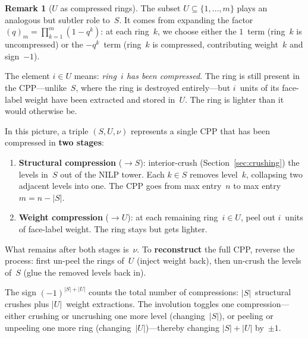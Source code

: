 \documentclass[11pt]{article}
\theoremstyle{plain}
\theoremstyle{definition}
\newtheorem{remark}[theorem]{Remark}
\begin{document}
\begin{remark}[$U$ as compressed rings]
\label{rmk:U-compressed}
The subset $U \subseteq \{1, \ldots, m\}$ plays an analogous but
subtler role to~$S$.  It comes from expanding the factor
$(q)_m = \prod_{k=1}^{m}(1-q^k)$: at each ring~$k$, we choose
either the $1$~term (ring~$k$ is uncompressed) or the $-q^k$~term
(ring~$k$ is compressed, contributing weight~$k$ and sign~$-1$).

The element $i \in U$ means: \emph{ring~$i$ has been compressed}.
The ring is still present in the CPP---unlike~$S$, where the ring
is destroyed entirely---but $i$~units of its face-label weight
have been extracted and stored in~$U$.  The ring is lighter than
it would otherwise be.

In this picture, a triple $(S, U, \nu)$ represents a single CPP
that has been compressed in \textbf{two stages}:
\begin{enumerate}
  \item \textbf{Structural compression} ($\to S$):\;
    interior-crush (Section~\ref{sec:crushing}) the levels in~$S$
    out of the NILP tower.  Each $k \in S$ removes level~$k$,
    collapsing two adjacent levels into one.  The CPP goes from
    max entry~$n$ to max entry~$m = n - |S|$.
  \item \textbf{Weight compression} ($\to U$):\;
    at each remaining ring~$i \in U$, peel out $i$~units of
    face-label weight.  The ring stays but gets lighter.
\end{enumerate}
What remains after both stages is~$\nu$.  To \textbf{reconstruct}
the full CPP, reverse the process: first un-peel the rings of~$U$
(inject weight back), then un-crush the levels of~$S$ (glue the
removed levels back in).

The sign $(-1)^{|S|+|U|}$ counts the total number of
compressions: $|S|$~structural crushes plus $|U|$~weight
extractions.  The involution toggles one compression---either
crushing or uncrushing one more level (changing~$|S|$), or
peeling or unpeeling one more ring (changing~$|U|$)---thereby
changing $|S|+|U|$ by~$\pm 1$.
\end{remark}
\end{document}
